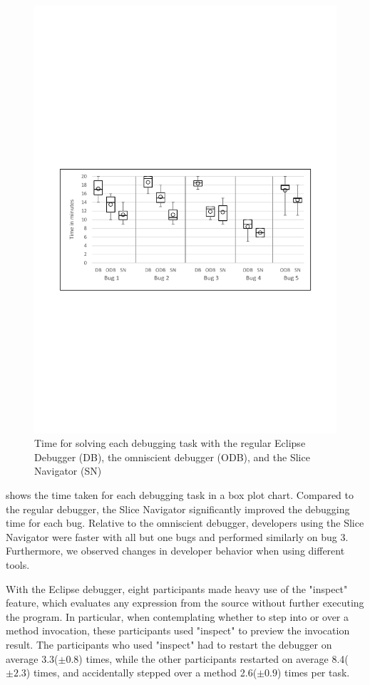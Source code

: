 \documentclass[
			english,
			review,
			]{elsarticle}
\begin{document}
\begin{figure}
	\centering %
		\includegraphics[width=\linewidth]{chart-times3.pdf}
	\caption{Time for solving each debugging task with the regular Eclipse Debugger (DB), the omniscient debugger (ODB), and the Slice Navigator (SN)}
	\label{fig:charttimes}
\end{figure}

 shows the time taken for each debugging task in a box plot chart.
Compared to the regular debugger, the Slice Navigator significantly improved the debugging time for each bug.
Relative to the omniscient debugger, developers using the Slice Navigator were faster with all but one bugs and performed similarly on bug 3.
Furthermore, we observed changes in developer behavior when using different tools.

With the Eclipse debugger, eight participants made heavy use of the "inspect" feature, which evaluates any expression from the source without further executing the program.
In particular, when contemplating whether to step into or over a method invocation, these participants used "inspect" to preview the invocation result.
The participants who used "inspect" had to restart the debugger on average 3.3($\pm0.8$) times, while the other participants restarted on average 8.4($\pm2.3$) times, and accidentally stepped over a method 2.6($\pm0.9$) times per task.
\end{document}
